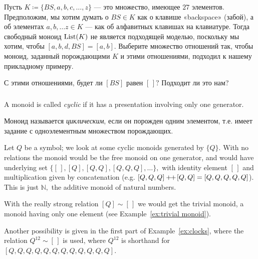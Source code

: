 \documentclass[../main/CT4S-EN-RU]{subfiles}
\begin{document}
\begin{exerciseRUS}
Пусть $K{\coloneqq}\{BS,a,b,c,\ldots,z\}$ — это множество, имеющее $27$ элементов. Предположим, мы хотим думать о $BS\in K$ как о клавише «backspace» (забой), а об элементах $a,b,\ldots z\in K$ — как об алфавитных клавишах на клавиатуре. Тогда свободный моноид $\operatorname{List}(K)$ не является подходящей моделью, поскольку мы хотим, чтобы $[a,b,d,BS]=[a,b].$
\sexc Выберите множество отношений так, чтобы моноид, заданный порождающими $K$ и этими отношениями, подходил к нашему прикладному примеру.
\item С этими отношениями, будет ли $[BS]$ равен $[\,]?$ Подходит ли это нам?
\endsexc
\end{exerciseRUS}


\subsubsection{}

\begin{definitionENG}
A monoid is called {\em cyclic} if it has a presentation involving only one generator.
\end{definitionENG}

\begin{definitionRUS}
Моноид называется {\em циклическим}, если он порожден одним элементом, т.е. имеет задание с одноэлементным множеством порождающих.
\end{definitionRUS}

\begin{exampleENG}\label{ex:cyclic}
Let $Q$ be a symbol; we look at some cyclic monoids generated by $\{Q\}.$ With no relations the monoid would be the free monoid on one generator, and would have underlying set $\{[\,],[Q],[Q,Q],[Q,Q,Q],\ldots\},$ with identity element $[\,]$ and multiplication given by concatenation (e.g. $[Q,Q,Q]+\!\!+\hspace{1pt}[Q,Q]=[Q,Q,Q,Q,Q]$). This is just ${ℕ},$ the additive monoid of natural numbers.

With the really strong relation $[Q]\sim[\,]$ we would get the trivial monoid, a monoid having only one element (see Example~\ref{ex:trivial monoid}).

Another possibility is given in the first part of Example~\ref{ex:clocks}, where the relation $Q^{12}\sim[\,]$ is used, where $Q^{12}$ is shorthand for $[Q,Q,Q,Q,Q,Q,Q,Q,Q,Q,Q,Q].$
\end{exampleENG}
\end{document}
